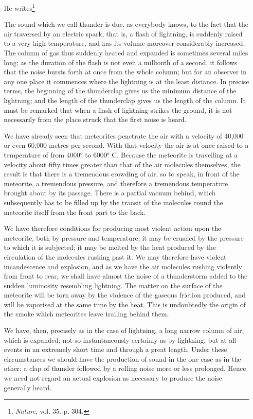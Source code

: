 \documentclass[a4paper, 12pt, oneside, polutonikogreek, english]{article}
\begin{document}
He writes\footnote{\emph{Nature}, vol. 35. p. 304.} ---

The sound which we call thunder is due, as everybody knows, to the fact that the air traversed by an electric spark, that is, a flash of lightning, is suddenly raised to a very high temperature, and has its volume moreover considerably increased. The column of gas thus suddenly heated and expanded is sometimes several miles long; as the duration of the flash is not even a millionth of a second, it follows that the noise bursts forth at once from the whole column; but for an observer in any one place it commences where the lightning is at the least distance. In precise terms, the beginning of the thunderclap gives us the minimum distance of the lightning; and the length of the thunderclap gives us the length of the column. It must be remarked that when a flash of lightning strikes the ground, it is not necessarily from the place struck that the first noise is heard.

We have already seen that meteorites penetrate the air with a velocity of 40,000 or even 60,000 metres per second. With that velocity the air is at once raised to a temperature of from 4000° to 6000° C. Because the meteorite is travelling at a velocity about fifty times greater than that of the air molecules themselves, the result is that there is a tremendous crowding of air, so to speak, in front of the meteorite, a tremendous pressure, and therefore a tremendous temperature brought about by its passage. There is a partial vacuum behind, which subsequently has to be filled up by the transit of the molecules round the meteorite itself from the front part to the back.

We have therefore conditions for producing most violent action upon the meteorite, both by pressure and temperature; it may be crushed by the pressure to which it is subjected; it may be melted by the heat produced by the circulation of the molecules rushing past it. We may therefore have violent incandescence and explosion, and as we have the air molecules rushing violently from front to rear, we shall have almost the noise of a thunderstorm added to the sudden luminosity resembling lightning. The matter on the surface of the meteorite will be torn away by the violence of the gaseous friction produced, and will be vaporised at the same time by the heat. This is undoubtedly the origin of the smoke which meteorites leave trailing behind them.

We have, then, precisely as in the case of lightning, a long narrow column of air, which is expanded; not so instantaneously certainly as by lightning, but at all events in an extremely short time and through a great length. Under these circumstances we should have the production of sound in the one case as in the other: a clap of thunder followed by a rolling noise more or less prolonged. Hence we need not regard an actual explosion as necessary to produce the noise generally heard.
\end{document}
